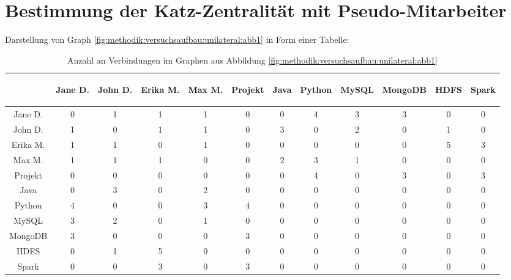 \section{Bestimmung der Katz-Zentralität mit Pseudo-Mitarbeiter}
\label{ch:nebenrechnungen:katzZentralitaetPseudoMitarbeiter}
Darstellung von Graph \ref{fig:methodik:versuchsaufbau:unilateral:abb1} in Form einer Tabelle:
\begin{table}[h]
	\centering
	\begin{tabular}{c|c|c|c|c|c|c|c|c|c|c|c}
		& \begin{sideways}Jane D.\end{sideways} & \begin{sideways}John D.\end{sideways} & \begin{sideways}Erika M.\end{sideways} & \begin{sideways}Max M.\end{sideways} & \begin{sideways}Projekt\end{sideways} & \begin{sideways}Java\end{sideways} & \begin{sideways}Python\end{sideways} & \begin{sideways}MySQL\end{sideways} & \begin{sideways}MongoDB\end{sideways} & \begin{sideways}HDFS\end{sideways} & \begin{sideways}Spark\end{sideways} \\
		\hline
		Jane D.  & 0 & 1 & 1 & 1 & 0 & 0 & 4 & 3 & 3 & 0 & 0\\
		John D.  & 1 & 0 & 1 & 1 & 0 & 3 & 0 & 2 & 0 & 1 & 0\\
		Erika M. & 1 & 1 & 0 & 1 & 0 & 0 & 0 & 0 & 0 & 5 & 3\\
		Max M.   & 1 & 1 & 1 & 0 & 0 & 2 & 3 & 1 & 0 & 0 & 0\\
		Projekt  & 0 & 0 & 0 & 0 & 0 & 0 & 4 & 0 & 3 & 0 & 3\\
		Java     & 0 & 3 & 0 & 2 & 0 & 0 & 0 & 0 & 0 & 0 & 0\\
		Python   & 4 & 0 & 0 & 3 & 4 & 0 & 0 & 0 & 0 & 0 & 0\\
		MySQL    & 3 & 2 & 0 & 1 & 0 & 0 & 0 & 0 & 0 & 0 & 0\\
		MongoDB  & 3 & 0 & 0 & 0 & 3 & 0 & 0 & 0 & 0 & 0 & 0\\
		HDFS     & 0 & 1 & 5 & 0 & 0 & 0 & 0 & 0 & 0 & 0 & 0\\
		Spark    & 0 & 0 & 3 & 0 & 3 & 0 & 0 & 0 & 0 & 0 & 0
	\end{tabular}
	\caption{Anzahl an Verbindungen im Graphen aus Abbildung \ref{fig:methodik:versuchsaufbau:unilateral:abb1}}
	\label{tbl:berechnungDerKatzZentralitaetPseudoMitarbeiter:tbl1}
\end{table}


